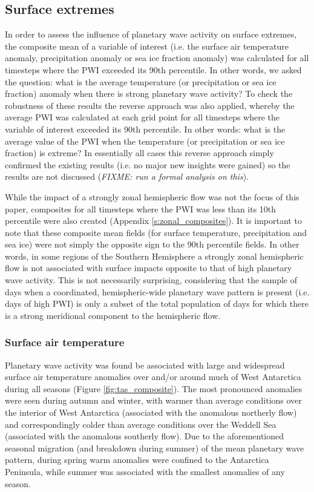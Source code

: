 \subsection{Surface extremes}

In order to assess the influence of planetary wave activity on surface extremes, the composite mean of a variable of interest (i.e. the surface air temperature anomaly, precipitation anomaly or sea ice fraction anomaly) was calculated for all timesteps where the PWI exceeded its 90th percentile. In other words, we asked the question: what is the average temperature (or precipitation or sea ice fraction) anomaly when there is strong planetary wave activity? To check the robustness of these results the reverse approach was also applied, whereby the average PWI was calculated at each grid point for all timesteps where the variable of interest exceeded its 90th percentile. In other words: what is the average value of the PWI when the temperature (or precipitation or sea ice fraction) is extreme? In essentially all cases this reverse approach simply confirmed the existing results (i.e. no major new insights were gained) so the results are not discussed (\textit{FIXME: run a formal analysis on this}).

While the impact of a strongly zonal hemispheric flow was not the focus of this paper, composites for all timesteps where the PWI was less than its 10th percentile were also created (Appendix \ref{s:zonal_composites}). It is important to note that these composite mean fields (for surface temperature, precipitation and sea ice) were not simply the opposite sign to the 90th percentile fields. In other words, in some regions of the Southern Hemisphere a strongly zonal hemispheric flow is not associated with surface impacts opposite to that of high planetary wave activity. This is not necessarily surprising, considering that the sample of days when a coordinated, hemispheric-wide planetary wave pattern is present (i.e. days of high PWI) is only a subset of the total population of days for which there is a strong meridional component to the hemispheric flow.

\subsubsection{Surface air temperature}

Planetary wave activity was found be associated with large and widespread surface air temperature anomalies over and/or around much of West Antarctica during all seasons (Figure \ref{fig:tas_composite}). The most pronounced anomalies were seen during autumn and winter, with warmer than average conditions over the interior of West Antarctica (associated with the anomalous northerly flow) and correspondingly colder than average conditions over the Weddell Sea (associated with the anomalous southerly flow). Due to the aforementioned seasonal migration (and breakdown during summer) of the mean planetary wave pattern, during spring warm anomalies were confined to the Antarctica Peninsula, while summer was associated with the smallest anomalies of any season.  

